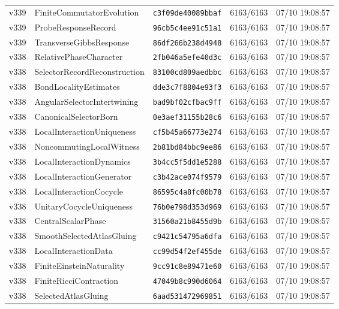 \documentclass[11pt]{article}
\theoremstyle{definition}\newtheorem{deriv}{Derivation}
\begin{document}
{\begin{longtable}{@{}lllll@{}}
v339 & FiniteCommutatorEvolution & \texttt{c3f09de40089bbaf} & 6163/6163 & 07/10 19:08:57 \\
v339 & ProbeResponseRecord & \texttt{96cb5c4ee91c51a1} & 6163/6163 & 07/10 19:08:57 \\
v339 & TransverseGibbsResponse & \texttt{86df266b238d4948} & 6163/6163 & 07/10 19:08:57 \\
v338 & RelativePhaseCharacter & \texttt{2fb046a5efe40d3c} & 6163/6163 & 07/10 19:08:57 \\
v338 & SelectorRecordReconstruction & \texttt{83100cd809aedbbc} & 6163/6163 & 07/10 19:08:57 \\
v338 & BondLocalityEstimates & \texttt{dde3c7f8804e93f3} & 6163/6163 & 07/10 19:08:57 \\
v338 & AngularSelectorIntertwining & \texttt{bad9bf02cfbac9ff} & 6163/6163 & 07/10 19:08:57 \\
v338 & CanonicalSelectorBorn & \texttt{0e3aef31155b28c6} & 6163/6163 & 07/10 19:08:57 \\
v338 & LocalInteractionUniqueness & \texttt{cf5b45a66773e274} & 6163/6163 & 07/10 19:08:57 \\
v338 & NoncommutingLocalWitness & \texttt{2b81bd84bbc9ee86} & 6163/6163 & 07/10 19:08:57 \\
v338 & LocalInteractionDynamics & \texttt{3b4cc5f5dd1e5288} & 6163/6163 & 07/10 19:08:57 \\
v338 & LocalInteractionGenerator & \texttt{c3b42ace074f9579} & 6163/6163 & 07/10 19:08:57 \\
v338 & LocalInteractionCocycle & \texttt{86595c4a8fc00b78} & 6163/6163 & 07/10 19:08:57 \\
v338 & UnitaryCocycleUniqueness & \texttt{76b0e798d353d969} & 6163/6163 & 07/10 19:08:57 \\
v338 & CentralScalarPhase & \texttt{31560a21b8455d9b} & 6163/6163 & 07/10 19:08:57 \\
v338 & SmoothSelectedAtlasGluing & \texttt{c9421c54795a6dfa} & 6163/6163 & 07/10 19:08:57 \\
v338 & LocalInteractionData & \texttt{cc99d54f2ef455de} & 6163/6163 & 07/10 19:08:57 \\
v338 & FiniteEinsteinNaturality & \texttt{9cc91c8e89471e60} & 6163/6163 & 07/10 19:08:57 \\
v338 & FiniteRicciContraction & \texttt{47049b8c990d6064} & 6163/6163 & 07/10 19:08:57 \\
v338 & SelectedAtlasGluing & \texttt{6aad531472969851} & 6163/6163 & 07/10 19:08:57 \\

\end{longtable}}
\end{document}

